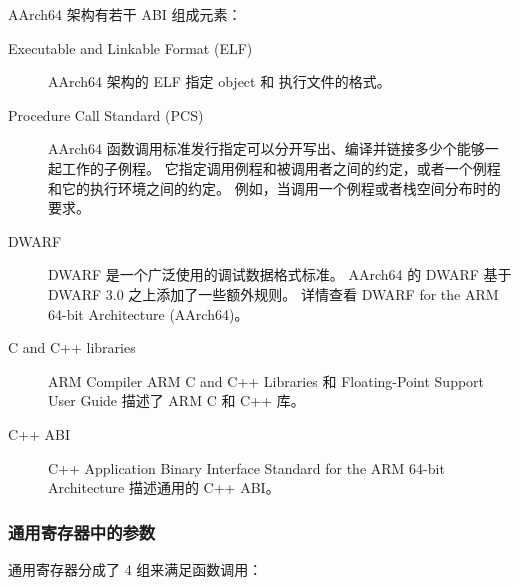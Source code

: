 AArch64 架构有若干 ABI 组成元素：

\begin{description}
  \item[Executable and Linkable Format (ELF)]
    AArch64 架构的 ELF 指定 object 和 执行文件的格式。
  \item[Procedure Call Standard (PCS)]
    AArch64 函数调用标准发行指定可以分开写出、编译并链接多少个能够一起工作的子例程。
    它指定调用例程和被调用者之间的约定，或者一个例程和它的执行环境之间的约定。
    例如，当调用一个例程或者栈空间分布时的要求。
  \item[DWARF]
    DWARF 是一个广泛使用的调试数据格式标准。
    AArch64 的 DWARF 基于 DWARF 3.0 之上添加了一些额外规则。
    详情查看 DWARF for the ARM 64-bit Architecture (AArch64)。
  \item[C and C++ libraries]
    ARM Compiler ARM C and C++ Libraries 和 Floating-Point Support User Guide 描述了 ARM C 和 C++ 库。
  \item[C++ ABI]
    C++ Application Binary Interface Standard for the ARM 64-bit Architecture 描述通用的 C++ ABI。
\end{description}

\subsubsection{通用寄存器中的参数}

通用寄存器分成了 4 组来满足函数调用：

